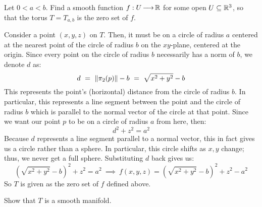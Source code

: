 

\newpage
\label{q41}
\begin{qu}[num=41.1]
    Let $ 0 < a < b $. Find a smooth function $ f:U \operatorname{\longrightarrow} \mathbb{R} $ for some open
    $ U \subseteq \mathbb{R}^{3} $, so that the torus $ T = T_{a,b} $ is the zero set
    of $ f $.
\end{qu}

\begin{soln}
    Consider a point $ (x,y,z) $ on $ T $. Then, it must be on a circle of radius
    $ a $ centered at the nearest point of the circle of radius $ b $ on the
    $ xy $-plane, centered at the origin. Since every point on the circle of
    radius $ b $ necessarily has a norm of $ b $, we denote $ d $ as:
    \begin{equation*}
        d \ = \ \norm{\pi_{2}(p)} - b \ = \ \sqrt{x^{2}+y^{2}}-b
    \end{equation*}
    This represents the point's (horizontal) distance from the circle of radius
    $ b $. In particular, this represents a line segment between the point and
    the circle of radius $ b $ which is parallel to the normal vector of the
    circle at that point. \vsp
    Since we want our point $ p $ to be on a circle of radius $ a $ from here,
    then:
    \begin{equation*}
        d^{2}+z^{2}=a^{2}
    \end{equation*}
    Because $ d $ represents a line segment parallel to a normal vector, this
    in fact gives us a circle rather than a sphere. In particular, this circle
    shifts as $ x,y $ change; thus, we never get a full sphere. Substituting
    $ d $ back gives us:
    \begin{equation*}
        (\sqrt{x^{2}+y^{2}}-b)^{2}+z^{2}=a^{2} \ \implies \
        f(x,y,z) = (\sqrt{x^{2}+y^{2}}-b)^{2}+z^{2}-a^{2}
    \end{equation*}
    So $ T $ is given as the zero set of $ f $ defined above.
\end{soln}

\newpage
\begin{qu}[num=41.2]
    Show that $ T $ is a smooth manifold.
\end{qu}

